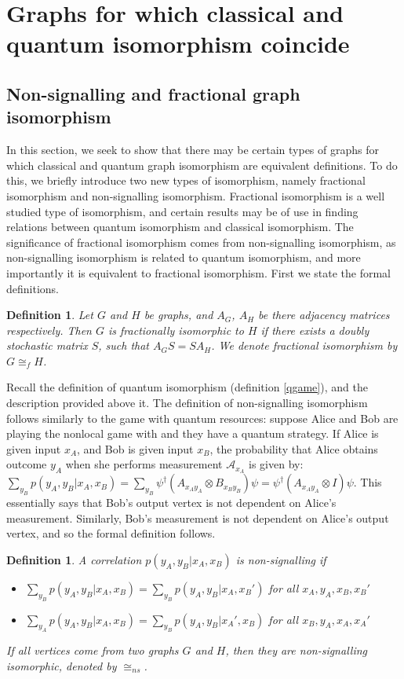 \documentclass[12pt]{article}
\newtheorem{defn}[thm]{Definition}
\begin{document}
\section{Graphs for which classical and quantum isomorphism coincide}
\subsection{Non-signalling and fractional graph isomorphism}
In this section, we seek to show that there may be certain types of graphs for which classical and quantum graph isomorphism are equivalent definitions. To do this, we briefly introduce two new types of isomorphism, namely fractional isomorphism and non-signalling isomorphism. Fractional isomorphism is a well studied type of isomorphism, and certain results may be of use in finding relations between quantum isomorphism and classical isomorphism. The significance of fractional isomorphism comes from non-signalling isomorphism, as non-signalling isomorphism is related to quantum isomorphism, and more importantly it is equivalent to fractional isomorphism. First we state the formal definitions.

\begin{defn} Let $G$ and $H$ be graphs, and $A_G$, $A_H$ be there adjacency matrices respectively. Then $G$ is fractionally isomorphic to $H$ if there exists a doubly stochastic matrix $S$, such that $A_GS = SA_H$. We denote fractional isomorphism by $G \cong_f H$.
\end{defn}

Recall the definition of quantum isomorphism (definition \ref{qgame}), and the description provided above it. The definition of non-signalling isomorphism follows similarly to the game with quantum resources: suppose Alice and Bob are playing the nonlocal game with and they have a quantum strategy. If Alice is given input $x_A$, and Bob is given input $x_B$, the probability that Alice obtains outcome $y_A$ when she performs measurement $\mathcal{A}_{x_A}$ is given by: $\sum_{y_B}p(y_A, y_B | x_A, x_B) = \sum_{y_B}\psi^\dag(A_{x_Ay_A}\otimes B_{x_By_B})\psi = \psi^\dag(A_{x_Ay_A}\otimes I)\psi$. This essentially says that Bob's output vertex is not dependent on Alice's measurement. Similarly, Bob's measurement is not dependent on Alice's output vertex, and so the formal definition follows.

\begin{defn}
A correlation $p(y_A, y_B | x_A, x_B)$ is non-signalling if 
\begin{itemize}
\item $\sum_{y_B}p(y_A, y_B | x_A, x_B) = \sum_{y_B}p(y_A, y_B | x_A, x_B')$ for all $x_A, y_A, x_B, x_B'$
\item $\sum_{y_A}p(y_A, y_B | x_A, x_B) = \sum_{y_B}p(y_A, y_B | x_A', x_B)$ for all $x_B, y_A, x_A, x_A'$
\end{itemize}
If all vertices come from two graphs $G$ and $H$, then they are non-signalling isomorphic, denoted by $\cong_{ns}$.
\end{defn}
\end{document}

